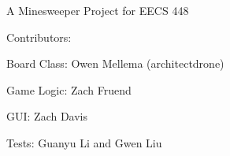 A Minesweeper Project for E\+E\+CS 448

Contributors\+:

Board Class\+: Owen Mellema (architectdrone)

Game Logic\+: Zach Fruend

G\+UI\+: Zach Davis

Tests\+: Guanyu Li and Gwen Liu 